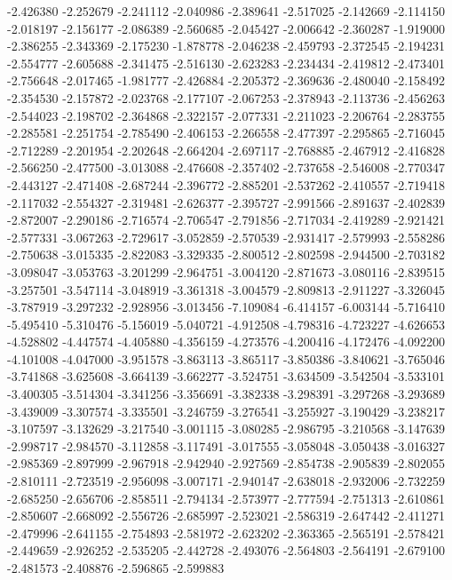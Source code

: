 -2.426380
-2.252679
-2.241112
-2.040986
-2.389641
-2.517025
-2.142669
-2.114150
-2.018197
-2.156177
-2.086389
-2.560685
-2.045427
-2.006642
-2.360287
-1.919000
-2.386255
-2.343369
-2.175230
-1.878778
-2.046238
-2.459793
-2.372545
-2.194231
-2.554777
-2.605688
-2.341475
-2.516130
-2.623283
-2.234434
-2.419812
-2.473401
-2.756648
-2.017465
-1.981777
-2.426884
-2.205372
-2.369636
-2.480040
-2.158492
-2.354530
-2.157872
-2.023768
-2.177107
-2.067253
-2.378943
-2.113736
-2.456263
-2.544023
-2.198702
-2.364868
-2.322157
-2.077331
-2.211023
-2.206764
-2.283755
-2.285581
-2.251754
-2.785490
-2.406153
-2.266558
-2.477397
-2.295865
-2.716045
-2.712289
-2.201954
-2.202648
-2.664204
-2.697117
-2.768885
-2.467912
-2.416828
-2.566250
-2.477500
-3.013088
-2.476608
-2.357402
-2.737658
-2.546008
-2.770347
-2.443127
-2.471408
-2.687244
-2.396772
-2.885201
-2.537262
-2.410557
-2.719418
-2.117032
-2.554327
-2.319481
-2.626377
-2.395727
-2.991566
-2.891637
-2.402839
-2.872007
-2.290186
-2.716574
-2.706547
-2.791856
-2.717034
-2.419289
-2.921421
-2.577331
-3.067263
-2.729617
-3.052859
-2.570539
-2.931417
-2.579993
-2.558286
-2.750638
-3.015335
-2.822083
-3.329335
-2.800512
-2.802598
-2.944500
-2.703182
-3.098047
-3.053763
-3.201299
-2.964751
-3.004120
-2.871673
-3.080116
-2.839515
-3.257501
-3.547114
-3.048919
-3.361318
-3.004579
-2.809813
-2.911227
-3.326045
-3.787919
-3.297232
-2.928956
-3.013456
-7.109084
-6.414157
-6.003144
-5.716410
-5.495410
-5.310476
-5.156019
-5.040721
-4.912508
-4.798316
-4.723227
-4.626653
-4.528802
-4.447574
-4.405880
-4.356159
-4.273576
-4.200416
-4.172476
-4.092200
-4.101008
-4.047000
-3.951578
-3.863113
-3.865117
-3.850386
-3.840621
-3.765046
-3.741868
-3.625608
-3.664139
-3.662277
-3.524751
-3.634509
-3.542504
-3.533101
-3.400305
-3.514304
-3.341256
-3.356691
-3.382338
-3.298391
-3.297268
-3.293689
-3.439009
-3.307574
-3.335501
-3.246759
-3.276541
-3.255927
-3.190429
-3.238217
-3.107597
-3.132629
-3.217540
-3.001115
-3.080285
-2.986795
-3.210568
-3.147639
-2.998717
-2.984570
-3.112858
-3.117491
-3.017555
-3.058048
-3.050438
-3.016327
-2.985369
-2.897999
-2.967918
-2.942940
-2.927569
-2.854738
-2.905839
-2.802055
-2.810111
-2.723519
-2.956098
-3.007171
-2.940147
-2.638018
-2.932006
-2.732259
-2.685250
-2.656706
-2.858511
-2.794134
-2.573977
-2.777594
-2.751313
-2.610861
-2.850607
-2.668092
-2.556726
-2.685997
-2.523021
-2.586319
-2.647442
-2.411271
-2.479996
-2.641155
-2.754893
-2.581972
-2.623202
-2.363365
-2.565191
-2.578421
-2.449659
-2.926252
-2.535205
-2.442728
-2.493076
-2.564803
-2.564191
-2.679100
-2.481573
-2.408876
-2.596865
-2.599883
